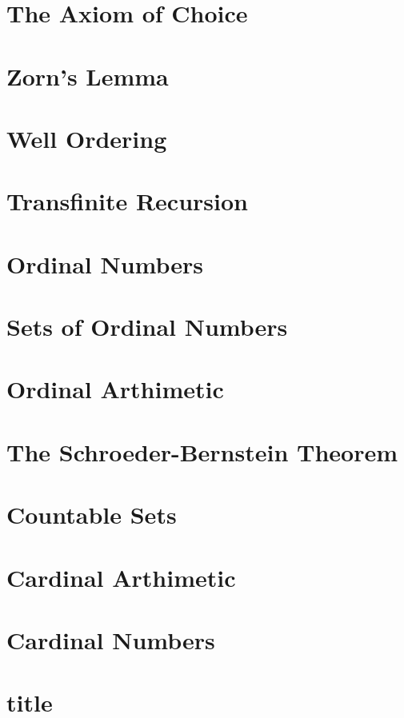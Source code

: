 \documentclass[a4paper,12pt]{article}
\begin{document}
\section{The Axiom of Choice}
\section{Zorn's Lemma}
\section{Well Ordering}
\section{Transfinite Recursion}
\section{Ordinal Numbers}
\section{Sets of Ordinal Numbers}
\section{Ordinal Arthimetic}
\newpage
\section{The Schroeder-Bernstein Theorem}
\section{Countable Sets}
\section{Cardinal Arthimetic}
\section{Cardinal Numbers}

\section{title}





\end{document}
